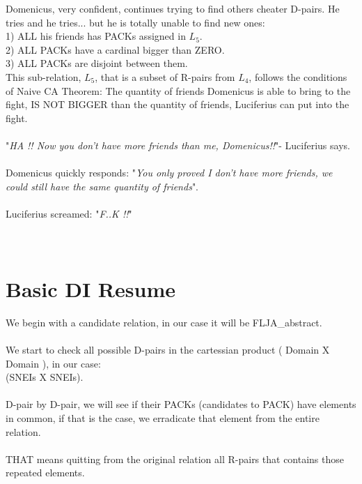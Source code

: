 	\noindent
	Domenicus, very confident, continues trying to find others cheater D-pairs. He tries and he tries... but he is totally unable to find new ones:\\
	1) ALL his friends has PACKs assigned in $L_{5}$.\\
	2) ALL PACKs have a cardinal bigger than ZERO.\\
	3) ALL PACKs are disjoint between them.\\
	This sub-relation, $L_{5}$, that is a subset of R-pairs from $L_{4}$, follows the conditions of Naive CA Theorem: The quantity of friends Domenicus is able to bring to the fight, IS NOT BIGGER than the quantity of friends, Luciferius can put into the fight.
	\\\\
	
	\noindent
	"\textit{HA !! Now you don't have more friends than me, Domenicus!!}"- Luciferius says.\\\\
	Domenicus quickly responds: "\textit{You only proved I don't have more friends, we could still have the same quantity of friends}".\\\\
	Luciferius screamed: "\textit{F..K !!}"\\
	\\\\
	
	\newpage
	
	\section{Basic DI Resume}
	
	\noindent
	We begin with a candidate relation, in our case it will be FLJA\_abstract.\\\\
	We start to check all possible D-pairs in the cartessian product ( Domain X Domain ), in our case:\\(SNEIs X SNEIs).\\\\
	D-pair by D-pair, we will see if their PACKs (candidates to PACK) have elements in common, if that is the case, we erradicate that element from the entire relation.\\\\
	THAT means quitting from the original relation all R-pairs that contains those repeated elements.\\
	\\\\
	
